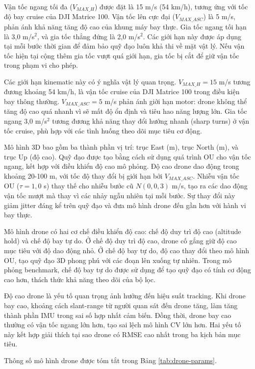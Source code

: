 Vận tốc ngang tối đa ($V_{MAX\_H}$) được đặt là 15 m/s (54 km/h), tương ứng với tốc độ bay cruise của DJI Matrice 100. Vận tốc lên cực đại ($V_{MAX\_ASC}$) là 5 m/s, phản ánh khả năng tăng độ cao của khung máy bay thực. Gia tốc ngang tối hạn là 3,0 m/s$^2$, và gia tốc thẳng đứng là 2,0 m/s$^2$. Các giới hạn này được áp dụng tại mỗi bước thời gian để đảm bảo quỹ đạo luôn khả thi về mặt vật lý. Nếu vận tốc hiện tại cộng thêm gia tốc vượt quá giới hạn, gia tốc bị cắt để giữ vận tốc trong phạm vi cho phép.

Các giới hạn kinematic này có ý nghĩa vật lý quan trọng. $V_{MAX\_H} = 15$ m/s tương đương khoảng 54 km/h, là vận tốc cruise của DJI Matrice 100 trong điều kiện bay thông thường. $V_{MAX\_ASC} = 5$ m/s phản ánh giới hạn motor: drone không thể tăng độ cao quá nhanh vì sẽ mất độ ổn định và tiêu hao năng lượng lớn. Gia tốc ngang 3,0 m/s$^2$ tương đương khả năng thay đổi hướng nhanh (sharp turns) ở vận tốc cruise, phù hợp với các tình huống theo dõi mục tiêu cơ động.

Mô hình 3D bao gồm ba thành phần vị trí: trục East (m), trục North (m), và trục Up (độ cao). Quỹ đạo được tạo bằng cách sử dụng quá trình OU cho vận tốc ngang, kết hợp với điều khiển độ cao mô phỏng. Độ cao drone dao động trong khoảng 20-100 m, với tốc độ thay đổi bị giới hạn bởi $V_{MAX\_ASC}$. Nhiễu vận tốc OU ($\tau = 1{,}0$ s) thay thế cho nhiễu bước cũ $N(0, 0{,}3)$ m/s, tạo ra các dao động vận tốc mượt mà thay vì các nhảy ngẫu nhiên tại mỗi bước. Sự thay đổi này giảm jitter đáng kể trên quỹ đạo và đưa mô hình drone đến gần hơn với hành vi bay thực.

Mô hình drone có hai cơ chế điều khiển độ cao: chế độ duy trì độ cao (altitude hold) và chế độ bay tự do. Ở chế độ duy trì độ cao, drone cố gắng giữ độ cao mục tiêu với độ dao động nhỏ. Ở chế độ bay tự do, độ cao thay đổi theo mô hình OU, tạo quỹ đạo 3D phong phú với các đoạn lên xuống tự nhiên. Trong mô phỏng benchmark, chế độ bay tự do được sử dụng để tạo quỹ đạo có tính cơ động cao hơn, thách thức khả năng theo dõi của bộ lọc.

Độ cao drone là yếu tố quan trọng ảnh hưởng đến hiệu suất tracking. Khi drone bay cao, khoảng cách slant-range từ người quan sát đến drone tăng, làm tăng thành phần IMU trong sai số hợp nhất cảm biến. Đồng thời, drone bay cao thường có vận tốc ngang lớn hơn, tạo sai lệch mô hình CV lớn hơn. Hai yếu tố này kết hợp giải thích tại sao drone có RMSE cao nhất trong ba kịch bản mục tiêu.

Thông số mô hình drone được tóm tắt trong Bảng \ref{tab:drone-params}.

